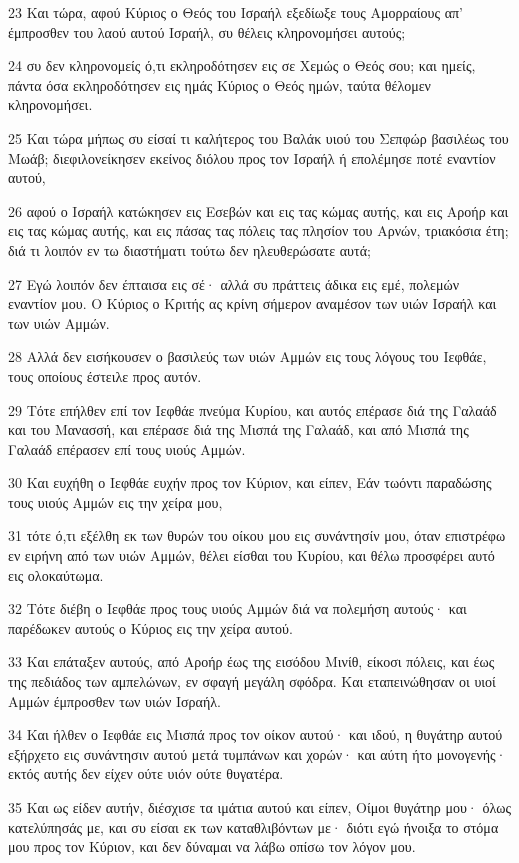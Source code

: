 \par 23 Και τώρα, αφού Κύριος ο Θεός του Ισραήλ εξεδίωξε τους Αμορραίους απ' έμπροσθεν του λαού αυτού Ισραήλ, συ θέλεις κληρονομήσει αυτούς;
\par 24 συ δεν κληρονομείς ό,τι εκληροδότησεν εις σε Χεμώς ο Θεός σου; και ημείς, πάντα όσα εκληροδότησεν εις ημάς Κύριος ο Θεός ημών, ταύτα θέλομεν κληρονομήσει.
\par 25 Και τώρα μήπως συ είσαί τι καλήτερος του Βαλάκ υιού του Σεπφώρ βασιλέως του Μωάβ; διεφιλονείκησεν εκείνος διόλου προς τον Ισραήλ ή επολέμησε ποτέ εναντίον αυτού,
\par 26 αφού ο Ισραήλ κατώκησεν εις Εσεβών και εις τας κώμας αυτής, και εις Αροήρ και εις τας κώμας αυτής, και εις πάσας τας πόλεις τας πλησίον του Αρνών, τριακόσια έτη; διά τι λοιπόν εν τω διαστήματι τούτω δεν ηλευθερώσατε αυτά;
\par 27 Εγώ λοιπόν δεν έπταισα εις σέ· αλλά συ πράττεις άδικα εις εμέ, πολεμών εναντίον μου. Ο Κύριος ο Κριτής ας κρίνη σήμερον αναμέσον των υιών Ισραήλ και των υιών Αμμών.
\par 28 Αλλά δεν εισήκουσεν ο βασιλεύς των υιών Αμμών εις τους λόγους του Ιεφθάε, τους οποίους έστειλε προς αυτόν.
\par 29 Τότε επήλθεν επί τον Ιεφθάε πνεύμα Κυρίου, και αυτός επέρασε διά της Γαλαάδ και του Μανασσή, και επέρασε διά της Μισπά της Γαλαάδ, και από Μισπά της Γαλαάδ επέρασεν επί τους υιούς Αμμών.
\par 30 Και ευχήθη ο Ιεφθάε ευχήν προς τον Κύριον, και είπεν, Εάν τωόντι παραδώσης τους υιούς Αμμών εις την χείρα μου,
\par 31 τότε ό,τι εξέλθη εκ των θυρών του οίκου μου εις συνάντησίν μου, όταν επιστρέφω εν ειρήνη από των υιών Αμμών, θέλει είσθαι του Κυρίου, και θέλω προσφέρει αυτό εις ολοκαύτωμα.
\par 32 Τότε διέβη ο Ιεφθάε προς τους υιούς Αμμών διά να πολεμήση αυτούς· και παρέδωκεν αυτούς ο Κύριος εις την χείρα αυτού.
\par 33 Και επάταξεν αυτούς, από Αροήρ έως της εισόδου Μινίθ, είκοσι πόλεις, και έως της πεδιάδος των αμπελώνων, εν σφαγή μεγάλη σφόδρα. Και εταπεινώθησαν οι υιοί Αμμών έμπροσθεν των υιών Ισραήλ.
\par 34 Και ήλθεν ο Ιεφθάε εις Μισπά προς τον οίκον αυτού· και ιδού, η θυγάτηρ αυτού εξήρχετο εις συνάντησιν αυτού μετά τυμπάνων και χορών· και αύτη ήτο μονογενής· εκτός αυτής δεν είχεν ούτε υιόν ούτε θυγατέρα.
\par 35 Και ως είδεν αυτήν, διέσχισε τα ιμάτια αυτού και είπεν, Οίμοι θυγάτηρ μου· όλως κατελύπησάς με, και συ είσαι εκ των καταθλιβόντων με· διότι εγώ ήνοιξα το στόμα μου προς τον Κύριον, και δεν δύναμαι να λάβω οπίσω τον λόγον μου.
